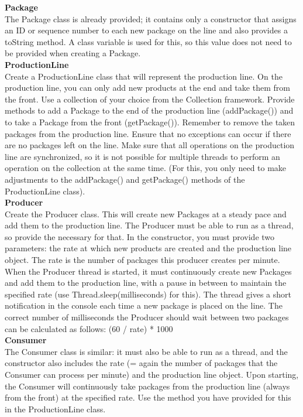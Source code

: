 \begin{oefening}
\textbf{Package}\\
The Package class is already provided; it contains only a constructor that assigns an ID or sequence number to each new package on the line and also provides a toString method. A class variable is used for this, so this value does not need to be provided when creating a Package.
\\
\textbf{ProductionLine}\\
Create a ProductionLine class that will represent the production line. On the production line, you can only add new products at the end and take them from the front. Use a collection of your choice from the Collection framework. Provide methods to add a Package to the end of the production line (addPackage()) and to take a Package from the front (getPackage()). Remember to remove the taken packages from the production line.
Ensure that no exceptions can occur if there are no packages left on the line.
Make sure that all operations on the production line are synchronized, so it is not possible for multiple threads to perform an operation on the collection at the same time. (For this, you only need to make adjustments to the addPackage() and getPackage() methods of the ProductionLine class).
\\
\textbf{Producer}\\
Create the Producer class. This will create new Packages at a steady pace and add them to the production line. The Producer must be able to run as a thread, so provide the necessary for that. In the constructor, you must provide two parameters: the rate at which new products are created and the production line object. The rate is the number of packages this producer creates per minute.
When the Producer thread is started, it must continuously create new Packages and add them to the production line, with a pause in between to maintain the specified rate (use Thread.sleep(milliseconds) for this). The thread gives a short notification in the console each time a new package is placed on the line.
The correct number of milliseconds the Producer should wait between two packages can be calculated as follows: (60 / rate) * 1000
\\
\textbf{Consumer}\\
The Consumer class is similar: it must also be able to run as a thread, and the constructor also includes the rate (= again the number of packages that the Consumer can process per minute) and the production line object.
Upon starting, the Consumer will continuously take packages from the production line (always from the front) at the specified rate. Use the method you have provided for this in the ProductionLine class.

\end{oefening}
